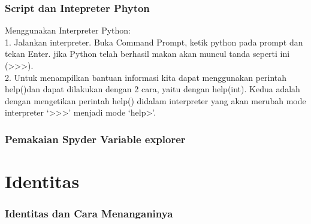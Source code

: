 \documentclass[11pt]{Article}
\begin{document}
\subsubsection{Script dan Intepreter Phyton}
Menggunakan Interpreter Python: \\
1. Jalankan interpreter. Buka Command Prompt, ketik python pada prompt dan tekan Enter. jika Python telah berhasil makan akan muncul tanda seperti ini (>>>).\\
2. Untuk menampilkan bantuan informasi kita dapat menggunakan perintah help()dan dapat dilakukan dengan 2 cara, yaitu dengan   help(int). Kedua adalah dengan mengetikan perintah help() didalam interpreter yang akan merubah mode interpreter ‘>>>’ menjadi mode ‘help>’.

\subsubsection{Pemakaian Spyder Variable explorer}


\section{Identitas}
\subsubsection{Identitas dan Cara Menanganinya}
\end{document}
